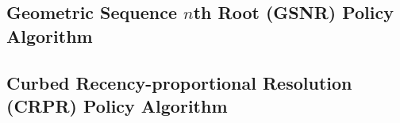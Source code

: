 



% 

\subsection{Geometric Sequence $n$th Root (GSNR) Policy Algorithm}




% 
% 

\subsection{Curbed Recency-proportional Resolution (CRPR) Policy Algorithm}




% 
% 
